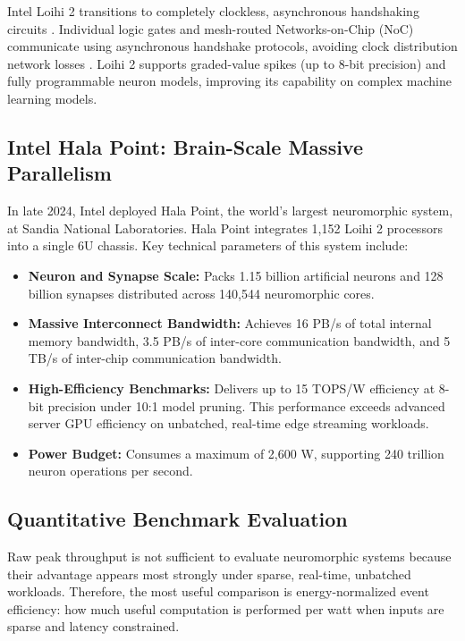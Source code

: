\documentclass[11pt]{article}
\begin{document}
Intel Loihi 2 transitions to completely clockless, asynchronous handshaking circuits \cite{schuman2017survey,mead1990neuromorphic}. Individual logic gates and mesh-routed Networks-on-Chip (NoC) communicate using asynchronous handshake protocols, avoiding clock distribution network losses \cite{schuman2017survey,mead1990neuromorphic}. Loihi 2 supports graded-value spikes (up to 8-bit precision) and fully programmable neuron models, improving its capability on complex machine learning models. 


\subsection{Intel Hala Point: Brain-Scale Massive Parallelism}
In late 2024, Intel deployed Hala Point, the world's largest neuromorphic system, at Sandia National Laboratories. Hala Point integrates 1,152 Loihi 2 processors into a single 6U chassis. 
Key technical parameters of this system include:
\begin{itemize}
    \item \textbf{Neuron and Synapse Scale:} Packs 1.15 billion artificial neurons and 128 billion synapses distributed across 140,544 neuromorphic cores.
    \item \textbf{Massive Interconnect Bandwidth:} Achieves 16 PB/s of total internal memory bandwidth, 3.5 PB/s of inter-core communication bandwidth, and 5 TB/s of inter-chip communication bandwidth.
    \item \textbf{High-Efficiency Benchmarks:} Delivers up to 15 TOPS/W efficiency at 8-bit precision under 10:1 model pruning. This performance exceeds advanced server GPU efficiency on unbatched, real-time edge streaming workloads.
    \item \textbf{Power Budget:} Consumes a maximum of 2,600 W, supporting 240 trillion neuron operations per second.
\end{itemize}

\subsection{Quantitative Benchmark Evaluation}
Raw peak throughput is not sufficient to evaluate neuromorphic systems because their advantage appears most strongly under sparse, real-time, unbatched workloads. Therefore, the most useful comparison is energy-normalized event efficiency: how much useful computation is performed per watt when inputs are sparse and latency constrained.
\end{document}
